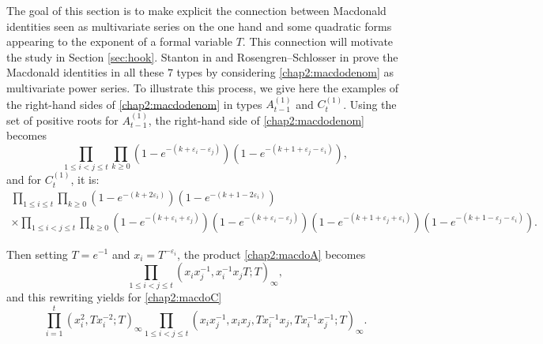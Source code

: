 \documentclass[11pt,letterpaper]{amsart}
\numberwithin{equation}{section}
\numberwithin{df}{section}
\begin{document}
The goal of this section is to make explicit the connection between Macdonald identities seen as multivariate series on the one hand and some quadratic forms appearing to the exponent of a formal variable $T$. This connection will motivate the study in Section \ref{sec:hook}. Stanton in \cite{Stanton} and Rosengren--Schlosser in \cite{RS} prove the Macdonald identities in all these $7$ types by considering \eqref{chap2:macdodenom} as multivariate power series. To illustrate this process, we give here the examples of the right-hand sides of \eqref{chap2:macdodenom} in types $A^{(1)}_{t-1}$ and $C^{(1)}_{t}$. Using the set of positive roots for $A^{(1)}_{t-1}$, the right-hand side of \eqref{chap2:macdodenom} becomes 
\begin{equation}\label{chap2:macdoA}
\prod_{1\leq i<j \leq t} \prod_{k\geq 0} \left(1-e^{-(k+\varepsilon_i-\varepsilon_j)}\right)\left(1-e^{-(k+1+\varepsilon_j-\varepsilon_i)}\right),
\end{equation}
and for $C^{(1)}_{t}$, it is:
\begin{multline}\label{chap2:macdoC}
\prod_{1\leq i \leq t} \prod_{k\geq 0} \left(1-e^{-(k+2\varepsilon_i)}\right)\left(1-e^{-(k+1-2\varepsilon_i)}\right)
\\\times\prod_{1\leq i<j \leq t} \prod_{k\geq 0} \left(1-e^{-(k+\varepsilon_i+\varepsilon_j)}\right)\left(1-e^{-(k+\varepsilon_i-\varepsilon_j)}\right)
 \left(1-e^{-(k+1+\varepsilon_j+\varepsilon_i)}\right)\left(1-e^{-(k+1-\varepsilon_j-\varepsilon_i)}\right).
\end{multline}

Then setting $T=e^{-1}$ and $x_i=T^{-\varepsilon_i}$, the product \eqref{chap2:macdoA} becomes
$$\prod_{1\leq i<j \leq t}\left(x_ix_j^{-1},x_i^{-1}x_jT;T\right)_\infty,$$
and this rewriting yields for \eqref{chap2:macdoC} 
$$\prod_{i=1}^t \left(x_i^2,Tx_i^{-2};T\right)_\infty\prod_{1\leq i<j \leq t}\left(x_ix_j^{-1},x_ix_j,Tx_i^{-1}x_j,Tx_i^{-1}x_j^{-1};T\right)_\infty.$$
\end{document}
